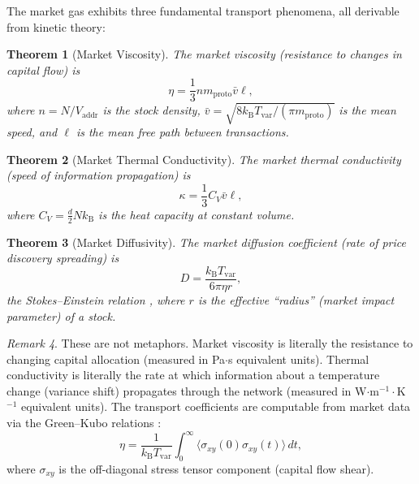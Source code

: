 \documentclass[twocolumn,10pt]{article}
\newtheorem{theorem}{Theorem}[section]
\theoremstyle{remark}
\newtheorem{remark}[theorem]{Remark}
\newcommand{\kB}{k_{\mathrm{B}}}
\newcommand{\Tvar}{T_{\mathrm{var}}}
\newcommand{\Vaddr}{V_{\mathrm{addr}}}
\newcommand{\mproto}{m_{\mathrm{proto}}}
\begin{document}
The market gas exhibits three fundamental transport phenomena, all derivable from kinetic theory:

\begin{theorem}[Market Viscosity]
\label{thm:viscosity}
The \emph{market viscosity} (resistance to changes in capital flow) is
\begin{equation}
    \eta = \frac{1}{3} n \mproto \bar{v} \ell,
    \label{eq:viscosity}
\end{equation}
where $n = N/\Vaddr$ is the stock density, $\bar{v} = \sqrt{8\kB\Tvar/(\pi\mproto)}$ is the mean speed, and $\ell$ is the mean free path between transactions.
\end{theorem}

\begin{theorem}[Market Thermal Conductivity]
\label{thm:thermal_conductivity}
The \emph{market thermal conductivity} (speed of information propagation) is
\begin{equation}
    \kappa = \frac{1}{3} C_V \bar{v} \ell,
    \label{eq:thermal_conductivity}
\end{equation}
where $C_V = \frac{d}{2} N \kB$ is the heat capacity at constant volume.
\end{theorem}

\begin{theorem}[Market Diffusivity]
\label{thm:diffusion}
The \emph{market diffusion coefficient} (rate of price discovery spreading) is
\begin{equation}
    D = \frac{\kB \Tvar}{6\pi\eta r},
    \label{eq:diffusion}
\end{equation}
the Stokes--Einstein relation \cite{einstein1905}, where $r$ is the effective ``radius'' (market impact parameter) of a stock.
\end{theorem}

\begin{remark}
These are not metaphors.  Market viscosity is literally the resistance to changing capital allocation (measured in Pa$\cdot$s equivalent units).  Thermal conductivity is literally the rate at which information about a temperature change (variance shift) propagates through the network (measured in W$\cdot$m$^{-1}\cdot$K$^{-1}$ equivalent units).  The transport coefficients are computable from market data via the Green--Kubo relations \cite{green1954,kubo1957}:
\begin{equation}
    \eta = \frac{1}{\kB \Tvar} \int_0^\infty \langle \sigma_{xy}(0) \sigma_{xy}(t) \rangle \, dt,
    \label{eq:green_kubo}
\end{equation}
where $\sigma_{xy}$ is the off-diagonal stress tensor component (capital flow shear).
\end{remark}
\end{document}
